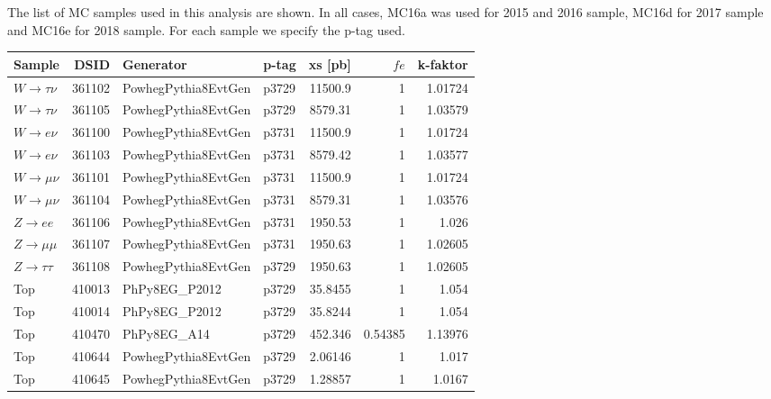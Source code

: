 
The list of MC samples used in this analysis are shown.
In all cases, MC16a was used for 2015 and 2016 sample, MC16d for 2017 sample and MC16e for 2018 sample.
For each sample we specify the p-tag used.


\begin{table}[h]
\begin{center}
 \begin{tabular}{ l|rllrrr } 
 Sample &   DSID & Generator           & p-tag   &     xs [pb] &   $fe$ &   k-faktor \\
 \hline\hline
 $W\rightarrow\tau\nu$  & 361102 & PowhegPythia8EvtGen & p3729   & 11500.9     &   1       &    1.01724 \\
 $W\rightarrow\tau\nu$  & 361105 & PowhegPythia8EvtGen & p3729   &  8579.31    &   1       &    1.03579 \\
 $W\rightarrow e\nu$     & 361100 & PowhegPythia8EvtGen & p3731   & 11500.9     &   1       &    1.01724 \\
 $W\rightarrow e\nu$     & 361103 & PowhegPythia8EvtGen & p3731   &  8579.42    &   1       &    1.03577 \\
 $W\rightarrow\mu\nu$   & 361101 & PowhegPythia8EvtGen & p3731   & 11500.9     &   1       &    1.01724 \\
 $W\rightarrow\mu\nu$   & 361104 & PowhegPythia8EvtGen & p3731   &  8579.31    &   1       &    1.03576 \\
 $Z\rightarrow ee$      & 361106 & PowhegPythia8EvtGen & p3731   &  1950.53    &   1       &    1.026   \\
 $Z\rightarrow\mu\mu$   & 361107 & PowhegPythia8EvtGen & p3731   &  1950.63    &   1       &    1.02605 \\
 $Z\rightarrow\tau\tau$ & 361108 & PowhegPythia8EvtGen & p3729   &  1950.63    &   1       &    1.02605 \\
 Top                       & 410013 & PhPy8EG\_P2012       & p3729   &    35.8455  &   1       &    1.054   \\
 Top                       & 410014 & PhPy8EG\_P2012       & p3729   &    35.8244  &   1       &    1.054   \\
 Top                       & 410470 & PhPy8EG\_A14         & p3729   &   452.346   &   0.54385 &    1.13976 \\
 Top                       & 410644 & PowhegPythia8EvtGen & p3729   &     2.06146 &   1       &    1.017   \\
 Top                       & 410645 & PowhegPythia8EvtGen & p3729   &     1.28857 &   1       &    1.0167  \\

\end{tabular}
\end{center}
\end{table}
